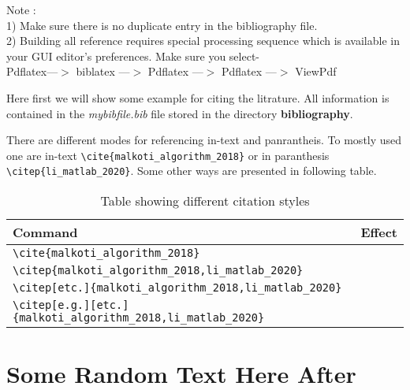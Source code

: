 Note :  		\\
1) Make sure there is no duplicate entry in the bibliography file.\\
2) Building all reference requires special processing sequence which is available in your GUI editor's preferences. Make sure you select-\\
Pdflatex---$>$ biblatex ---$>$ Pdflatex ---$>$ Pdflatex ---$>$ ViewPdf


Here first we will show some example for citing the litrature. 
All information is contained in the \textit{mybibfile.bib} file stored in the 
directory \textbf{bibliography}. 


There are different modes for referencing in-text and panrantheis. 
To mostly used one are in-text  \verb|\cite{malkoti_algorithm_2018}|  or in paranthesis \verb|\citep{li_matlab_2020}|.   
Some other ways are presented in following table.


\begin{table}[!h]
\caption{Table showing different citation styles}
\label{tab:citation_style}
\begin{tabular}{ll}	
	\hline
	Command  & Effect \\
	\hline
	\verb|\cite{malkoti_algorithm_2018}|   &\cite{malkoti_algorithm_2018}\\
	\verb|\citep{malkoti_algorithm_2018,li_matlab_2020}|   &\citep{malkoti_algorithm_2018,li_matlab_2020}\\
	\verb|\citep[etc.]{malkoti_algorithm_2018,li_matlab_2020}|   &\citep[etc.]{malkoti_algorithm_2018,li_matlab_2020}\\
	\verb|\citep[e.g.][etc.]{malkoti_algorithm_2018,li_matlab_2020}|   &\citep[e.g.][etc.]{malkoti_algorithm_2018,li_matlab_2020} \\
	\hline	
\end{tabular}

\end{table}


\section{Some Random Text Here After}
\lipsum[1-20]
  